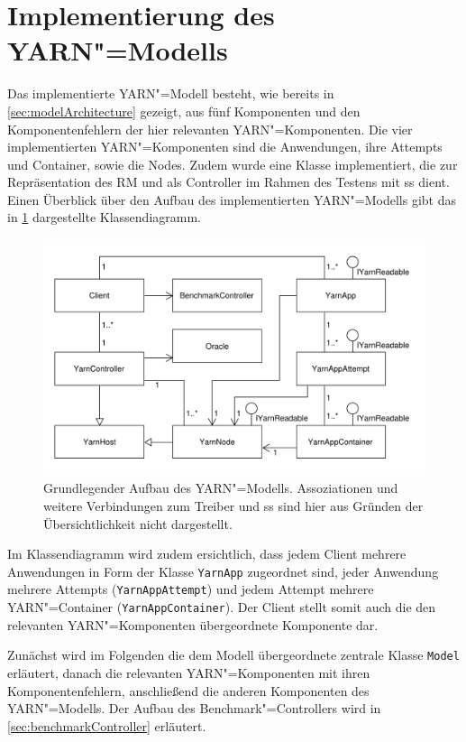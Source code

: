 \section{Implementierung des YARN"=Modells}
\label{sec:yarnModel}

Das implementierte YARN"=Modell besteht, wie bereits in \cref{sec:modelArchitecture} gezeigt, aus fünf Komponenten und den Komponentenfehlern der hier relevanten YARN"=Komponenten.
Die vier implementierten YARN"=Komponenten sind die Anwendungen, ihre Attempts und Container, sowie die Nodes.
Zudem wurde eine Klasse implementiert, die zur Repräsentation des \gls{RM} und als Controller im Rahmen des Testens mit \gls{ss} dient.
Einen Überblick über den Aufbau des implementierten YARN"=Modells gibt das in \cref{fig:yarnModelClassDiagram} dargestellte Klassendiagramm.

\begin{figure}
    \includegraphics{./resources/yarnModel_ls_MA.pdf}
    \caption[Grundlegender Aufbau des YARN"=Modells]
        {Grundlegender Aufbau des YARN"=Modells.
        Assoziationen und weitere Verbindungen zum Treiber und \acrshort{ss} sind hier aus Gründen der Übersichtlichkeit nicht dargestellt.}
    \label{fig:yarnModelClassDiagram}
\end{figure}

Im Klassendiagramm wird zudem ersichtlich, dass jedem Client mehrere Anwendungen in Form der Klasse \texttt{YarnApp} zugeordnet sind, jeder Anwendung mehrere Attempts (\texttt{YarnAppAttempt}) und jedem Attempt mehrere YARN"=Container (\texttt{YarnAppContainer}).
Der Client stellt somit auch die den relevanten YARN"=Komponenten übergeordnete Komponente dar.

Zunächst wird im Folgenden die dem Modell übergeordnete zentrale Klasse \texttt{Model} erläutert, danach die relevanten YARN"=Komponenten mit ihren Komponentenfehlern, anschließend die anderen Komponenten des YARN"=Modells.
Der Aufbau des Benchmark"=Controllers wird in \cref{sec:benchmarkController} erläutert.

